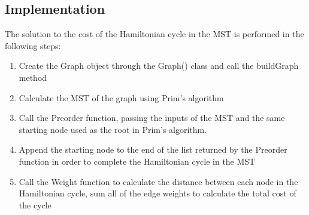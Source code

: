 \subsection{Implementation}
The solution to the cost of the Hamiltonian cycle in the MST is performed in the following steps:
\begin{enumerate}
    \item Create the Graph object through the Graph() class and call the buildGraph method
    \item Calculate the MST of the graph using Prim's algorithm
    \item Call the Preorder function, passing the inputs of the MST and the same starting node used as the root in Prim's algorithm.
    \item Append the starting node to the end of the list returned by the Preorder function in order to complete the Hamiltonian cycle in the MST 
    \item Call the Weight function to calculate the distance between each node in the Hamiltonian cycle, sum all of the edge weights to calculate the total cost of the cycle
\end{enumerate}
\pagebreak